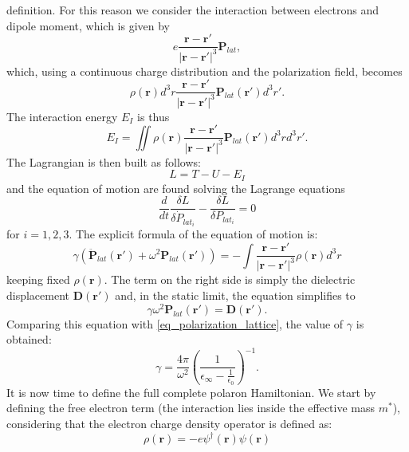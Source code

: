 \documentclass[12pt, a4paper]{report}
\numberwithin{equation}{section}
\begin{document}
definition. For this reason we consider the interaction between electrons and dipole moment, which is given by 
\begin{equation}
    e\frac{\mathbf{r}-\mathbf{r}'}{|\mathbf{r}-\mathbf{r}'|^3}\mathbf{P}_{lat},
\end{equation}
which, using a continuous charge distribution and the polarization field, becomes
\begin{equation}
    \rho(\mathbf{r})d^3r\frac{\mathbf{r}-\mathbf{r}'}{|\mathbf{r}-\mathbf{r}'|^3}\mathbf{P}_{lat}(\mathbf{r}')d^3r'.
\end{equation}
The interaction energy $E_I$ is thus
\begin{equation}
    E_I=\iint \rho(\mathbf{r})\frac{\mathbf{r}-\mathbf{r}'}{|\mathbf{r}-\mathbf{r}'|^3}\mathbf{P}_{lat}(\mathbf{r}')d^3rd^3r'.
\end{equation}
The Lagrangian is then built as follows:
\begin{equation}
    L=T-U-E_I
\end{equation}
and the equation of motion are found solving the Lagrange equations
\begin{equation}
    \frac{d}{dt}\frac{\delta L}{\delta \dot{P}_{lat_i}}-\frac{\delta L}{\delta P_{lat_i}}=0
\end{equation}
for $i=1,2,3$. The explicit formula of the equation of motion is:
\begin{equation}
    \gamma(\ddot{\mathbf{P}}_{lat}(\mathbf{r}')+\omega^2\mathbf{P}_{lat}(\mathbf{r}'))=-\int \frac{\mathbf{r}-\mathbf{r}'}{|\mathbf{r}-\mathbf{r'}|^3}\rho(\mathbf{r})d^3r
\end{equation}
keeping fixed $\rho(\mathbf{r})$. The term on the right side is simply the dielectric displacement $\mathbf{D}(\mathbf{r}')$ and, in the 
static limit, the equation simplifies to
\begin{equation}
    \gamma\omega^2\mathbf{P}_{lat}(\mathbf{r}')=\mathbf{D}(\mathbf{r}').
\end{equation}
Comparing this equation with \ref{eq_polarization_lattice}, the value of $\gamma$ is obtained:
\begin{equation}
    \gamma = \frac{4\pi}{\omega^2}\left(\frac{1}{\epsilon_\infty-\frac{1}{\epsilon_0}}\right)^{-1}.
\end{equation}
It is now time to define the full complete polaron Hamiltonian. We start by defining the free electron term (the interaction lies inside 
the effective mass $m^*$), considering that the electron charge density operator is defined as:
\begin{equation}
    \rho(\mathbf{r})=-e\psi^\dagger(\mathbf{r})\psi(\mathbf{r})
\end{equation}
\end{document}
